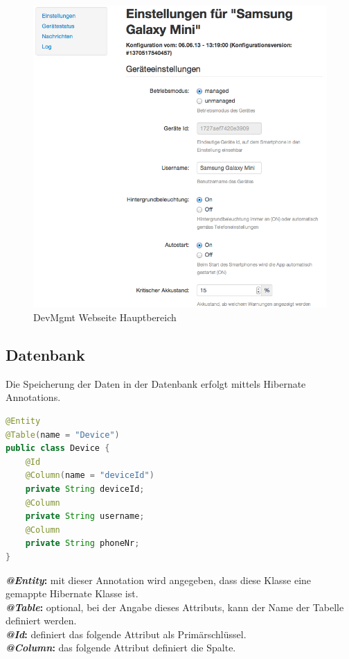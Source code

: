 \begin{figure}[H]
	\centering
	\includegraphics[width=120mm]{images/devmgmtsrv/settings.png}
	\caption{DevMgmt Webseite Hauptbereich}
\end{figure}

\pagebreak
\subsection{Datenbank}
Die Speicherung der Daten in der Datenbank erfolgt mittels Hibernate Annotations.

\begin{lstlisting}[language=Java, caption=Hibernate Annotation]
@Entity
@Table(name = "Device")
public class Device {
	@Id
	@Column(name = "deviceId")
	private String deviceId;
	@Column
	private String username;
	@Column
	private String phoneNr;
}
\end{lstlisting}

\textbf{\textit{@Entity}:} mit dieser Annotation wird angegeben, dass diese Klasse eine gemappte Hibernate Klasse ist.\\
\textbf{\textit{@Table}:} optional, bei der Angabe dieses Attributs, kann der Name der Tabelle definiert werden.\\
\textbf{\textit{@Id}:} definiert das folgende Attribut als Primärschlüssel.\\
\textbf{\textit{@Column}:} das folgende Attribut definiert die Spalte.
